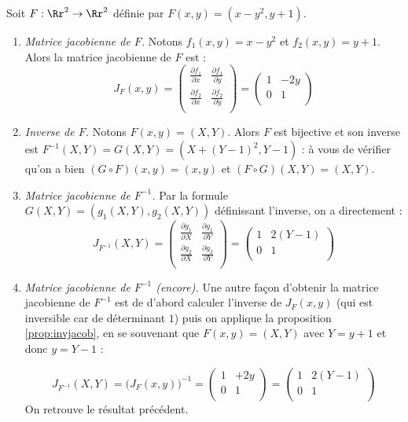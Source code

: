 \documentclass[11pt, class=report,crop=false]{standalone}
\begin{document}
\begin{exemple}
Soit $F : \Rr^2 \to \Rr^2$ définie par $F(x,y) = (x-y^2,y+1)$.

\begin{enumerate}
     \item \emph{Matrice jacobienne de $F$.}
Notons $f_1(x,y)=x-y^2$ et $f_2(x,y)=y+1$.
Alors la matrice jacobienne de $F$ est :
$$J_F(x,y) = 
\begin{pmatrix}
\frac{\partial f_1}{\partial x} & \frac{\partial f_1}{\partial y} \\
\frac{\partial f_2}{\partial x} & \frac{\partial f_2}{\partial y} \\
\end{pmatrix}
= 
\begin{pmatrix}
1 & -2y \\
0 & 1 \\
\end{pmatrix}$$

     \item \emph{Inverse de $F$.}
     Notons $F(x,y) = (X,Y)$. Alors $F$ est bijective et son inverse est 
     $F^{-1}(X,Y) = G(X,Y) = (X+(Y-1)^2, Y-1)$ : à vous de vérifier qu'on a bien $(G \circ F)(x,y) = (x,y)$ et  $(F \circ G)(X,Y) = (X,Y)$.
     
     \item \emph{Matrice jacobienne de $F^{-1}$.}
     Par la formule $G(X,Y) = (g_1(X,Y),g_2(X,Y))$ définissant l'inverse, on a directement :
     $$J_{F^{-1}}(X,Y) = 
     \begin{pmatrix}
     \frac{\partial g_1}{\partial X} & \frac{\partial g_1}{\partial Y} \\
     \frac{\partial g_2}{\partial X} & \frac{\partial g_2}{\partial Y} \\
     \end{pmatrix}
     = 
     \begin{pmatrix}
     1 & 2(Y-1) \\
     0 & 1 \\
     \end{pmatrix}$$
     
     \item \emph{Matrice jacobienne de $F^{-1}$ (encore).}    
     Une autre façon d'obtenir la matrice jacobienne de $F^{-1}$ est de d'abord calculer l'inverse de  $J_F(x,y)$ (qui est inversible car de déterminant $1$) puis on applique la proposition \ref{prop:invjacob}, en se souvenant que $F(x,y) = (X,Y)$
     avec $Y=y+1$ et donc $y=Y-1$ :
     
     $$J_{F^{-1}}(X,Y) = \big(J_F(x,y)\big)^{-1} 
     = \begin{pmatrix}
     1 & +2y \\
     0 & 1 \\
     \end{pmatrix}
     = \begin{pmatrix}
     1 & 2(Y-1) \\
     0 & 1 \\
    \end{pmatrix}     
     $$
     On retrouve le résultat précédent.
     \end{enumerate}    

\end{exemple}
\end{document}

